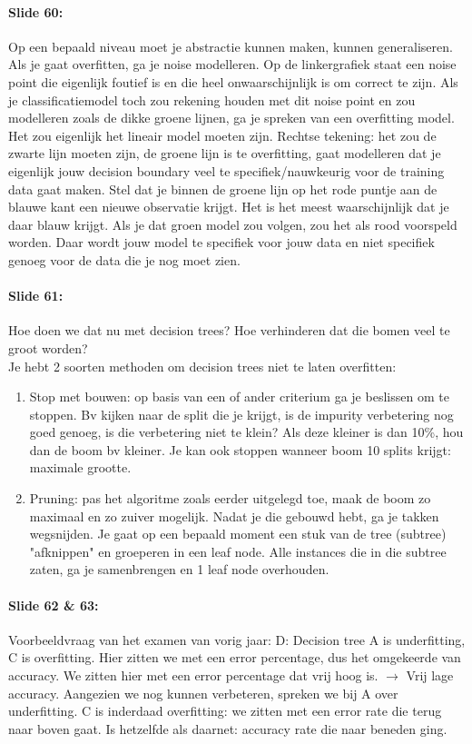 \documentclass[10pt,a4paper]{report}
\begin{document}
\paragraph{Slide 60:}Op een bepaald niveau moet je abstractie kunnen maken, kunnen generaliseren. Als je gaat overfitten, ga je noise modelleren. Op de linkergrafiek staat een noise point die eigenlijk foutief is en die heel onwaarschijnlijk is om correct te zijn. Als je classificatiemodel toch zou rekening houden met dit noise point en zou modelleren zoals de dikke groene lijnen, ga je spreken van een overfitting model. Het zou eigenlijk het lineair model moeten zijn. Rechtse tekening: het zou de zwarte lijn moeten zijn, de groene lijn is te overfitting, gaat modelleren dat je eigenlijk jouw decision boundary veel te specifiek/nauwkeurig voor de training data gaat maken.
Stel dat je binnen de groene lijn op het rode puntje aan de blauwe kant een nieuwe observatie krijgt. Het is het meest waarschijnlijk dat je daar blauw krijgt. Als je dat groen model zou volgen, zou het als rood voorspeld worden. Daar wordt jouw model te specifiek voor jouw data en niet specifiek genoeg voor de data die je nog moet zien.

\paragraph{Slide 61:}Hoe doen we dat nu met decision trees? Hoe verhinderen dat die bomen veel te groot worden?\\
Je hebt 2 soorten methoden om decision trees niet te laten overfitten:
\begin{enumerate}
\item Stop met bouwen: op basis van een of ander criterium ga je beslissen om te stoppen. Bv kijken naar de split die je krijgt, is de impurity verbetering nog goed genoeg, is die verbetering niet te klein? Als deze kleiner is dan 10\%, hou dan de boom bv kleiner. Je kan ook stoppen wanneer boom 10 splits krijgt: maximale grootte.
\item Pruning: pas het algoritme zoals eerder uitgelegd toe, maak de boom zo maximaal en zo zuiver mogelijk. Nadat je die gebouwd hebt, ga je takken wegsnijden. Je gaat op een bepaald moment een stuk van de tree (subtree) "afknippen" en groeperen in een leaf node. Alle instances die in die subtree zaten, ga je samenbrengen en 1 leaf node overhouden.
\end{enumerate}

\paragraph{Slide 62 \& 63:}Voorbeeldvraag van het examen van vorig jaar: 
D: Decision tree A is underfitting, C is overfitting. Hier zitten we met een error percentage, dus het omgekeerde van accuracy. We zitten hier met een error percentage dat vrij hoog is. $\rightarrow$ Vrij lage accuracy. Aangezien we nog kunnen verbeteren, spreken we bij A over underfitting. C is inderdaad overfitting: we zitten met een error rate die terug naar boven gaat. Is hetzelfde als daarnet: accuracy rate die naar beneden ging.
	
\end{document}

